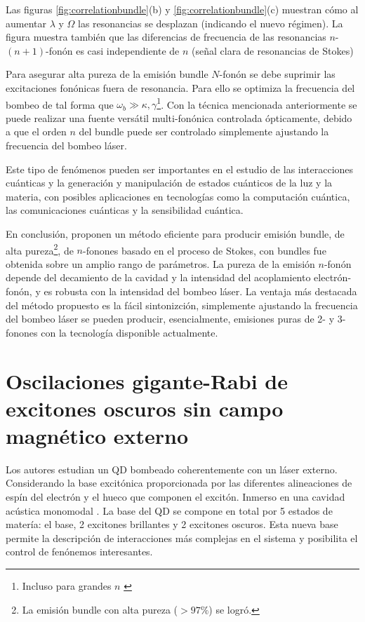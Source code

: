 \documentclass[../main.tex]{subfiles}
\begin{document}
Las figuras \ref{fig:correlationbundle}(b) y \ref{fig:correlationbundle}(c) muestran cómo al aumentar $\lambda$ y $\Omega$ las resonancias se desplazan (indicando el nuevo régimen). La figura muestra también que las diferencias de frecuencia de las resonancias $n$- $(n+1)$-fonón es casi independiente de $n$ (señal clara de resonancias de Stokes)

Para asegurar alta pureza de la emisión bundle $N$-fonón se debe suprimir las excitaciones fonónicas fuera de resonancia. Para ello se optimiza la frecuencia del bombeo de tal forma que $\omega_b \gg \kappa, \gamma$\footnote{Incluso para grandes $n$ \parencite{Bin2020}}. Con la técnica mencionada anteriormente se puede realizar una fuente versátil multi-fonónica controlada ópticamente, debido a que el orden $n$ del bundle puede ser controlado simplemente ajustando la frecuencia del bombeo láser.

Este tipo de fenómenos pueden ser importantes en el estudio de las interacciones cuánticas y la generación y manipulación de estados cuánticos de la luz y la materia, con posibles aplicaciones en tecnologías como la computación cuántica, las comunicaciones cuánticas y la sensibilidad cuántica.

En conclusión, proponen un método eficiente para producir emisión bundle, de alta pureza\footnote{La emisión bundle con alta pureza ($>97\%$) se logró.}, de $n$-fonones basado en el proceso de Stokes, con bundles  fue obtenida sobre un amplio rango de parámetros. La pureza de la emisión $n$-fonón depende del decamiento de la cavidad y la intensidad del acoplamiento electrón-fonón, y es robusta con la intensidad del bombeo láser. La ventaja más destacada del método propuesto es la fácil sintonizción, simplemente ajustando la frecuencia del bombeo láser se pueden producir, esencialmente, emisiones puras de 2- y 3-fonones con la tecnología disponible actualmente.

%
\section[Oscilaciones gigante-Rabi de excitones oscuros sin campo magnético ...]{Oscilaciones gigante-Rabi de excitones oscuros sin campo magnético externo}\label{sec:giant-Rabi}
Los autores \parencite{Vargas2022} estudian un QD bombeado coherentemente con un láser externo. Considerando la base excitónica proporcionada por las diferentes alineaciones de espín del electrón y el hueco que componen el excitón. Inmerso en una cavidad acústica monomodal \parencite{Weib2018}. La base del QD se compone en total por 5 estados de matería: el base, 2 excitones brillantes y 2 excitones oscuros. Esta nueva base permite la descripción de interacciones más complejas en el sistema y posibilita el control de fenónemos interesantes.
\end{document}
